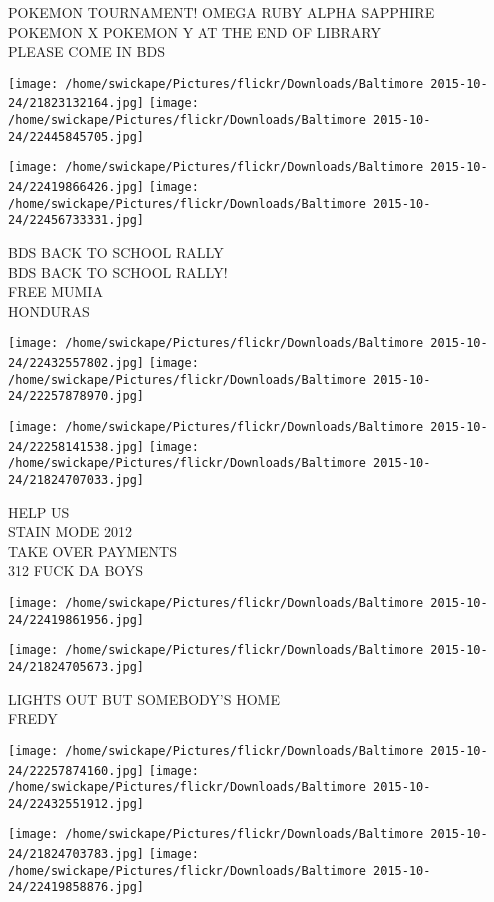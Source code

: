 \documentclass[10pt,letterpaper]{article}
\begin{document}
POKEMON TOURNAMENT!  OMEGA RUBY ALPHA SAPPHIRE POKEMON X POKEMON Y AT THE END OF LIBRARY\\
PLEASE COME IN BDS
\pagebreak

\texttt{[image: /home/swickape/Pictures/flickr/Downloads/Baltimore 2015-10-24/21823132164.jpg]}
\texttt{[image: /home/swickape/Pictures/flickr/Downloads/Baltimore 2015-10-24/22445845705.jpg]}

\texttt{[image: /home/swickape/Pictures/flickr/Downloads/Baltimore 2015-10-24/22419866426.jpg]}
\texttt{[image: /home/swickape/Pictures/flickr/Downloads/Baltimore 2015-10-24/22456733331.jpg]}

BDS BACK TO SCHOOL RALLY\\
BDS BACK TO SCHOOL RALLY!\\
FREE MUMIA\\
HONDURAS
\pagebreak

\texttt{[image: /home/swickape/Pictures/flickr/Downloads/Baltimore 2015-10-24/22432557802.jpg]}
\texttt{[image: /home/swickape/Pictures/flickr/Downloads/Baltimore 2015-10-24/22257878970.jpg]}

\texttt{[image: /home/swickape/Pictures/flickr/Downloads/Baltimore 2015-10-24/22258141538.jpg]}
\texttt{[image: /home/swickape/Pictures/flickr/Downloads/Baltimore 2015-10-24/21824707033.jpg]}

HELP US\\
STAIN MODE 2012\\
TAKE OVER PAYMENTS\\
312 FUCK DA BOYS
\pagebreak

\texttt{[image: /home/swickape/Pictures/flickr/Downloads/Baltimore 2015-10-24/22419861956.jpg]}

\vspace{0.25in}
\texttt{[image: /home/swickape/Pictures/flickr/Downloads/Baltimore 2015-10-24/21824705673.jpg]}

LIGHTS OUT BUT SOMEBODY'S HOME\\
FREDY
\pagebreak

\texttt{[image: /home/swickape/Pictures/flickr/Downloads/Baltimore 2015-10-24/22257874160.jpg]}
\texttt{[image: /home/swickape/Pictures/flickr/Downloads/Baltimore 2015-10-24/22432551912.jpg]}

\texttt{[image: /home/swickape/Pictures/flickr/Downloads/Baltimore 2015-10-24/21824703783.jpg]}
\texttt{[image: /home/swickape/Pictures/flickr/Downloads/Baltimore 2015-10-24/22419858876.jpg]}
\end{document}
